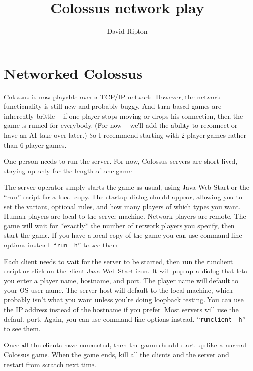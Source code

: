 \documentclass{article}
\begin{document}

\title{Colossus network play}

\author{David Ripton}

\maketitle

\section{Networked Colossus}

Colossus is now playable over a TCP/IP network.  However, the network 
functionality is still new and probably buggy.  And turn-based games
are inherently brittle -- if one player stops moving or drops his 
connection, then the game is ruined for everybody.  (For now -- we'll
add the ability to reconnect or have an AI take over later.)  So I
recommend starting with 2-player games rather than 6-player games.

One person needs to run the server.  For now, Colossus servers are 
short-lived, staying up only for the length of one game.

The server operator simply starts the game as usual, using Java Web
Start or the ``run'' script for a local copy.  The startup dialog 
should appear, allowing you to set the variant, optional rules, and 
how many players of which types you want.  Human players are local 
to the server machine.  Network players are remote.  The game will 
wait for *exactly* the number of network players you specify, then 
start the game.  If you have a local copy of the game you can use 
command-line options instead.  ``\texttt{run -h}'' to see them.

Each client needs to wait for the server to be started, then run
the runclient script or click on the client Java Web Start icon.  
It will pop up a dialog that lets you enter a player name, hostname, 
and port.  The player name will default to your OS user name.  The 
server host will default to the local machine, which probably isn't 
what you want unless you're doing loopback testing.  You can use the 
IP address instead of the hostname if you prefer.  Most servers will 
use the default port.  Again, you can use command-line options 
instead.  ``\texttt{runclient -h}'' to see them.

Once all the clients have connected, then the game should start up like
a normal Colossus game.  When the game ends, kill all the clients and
the server and restart from scratch next time.
\end{document}
